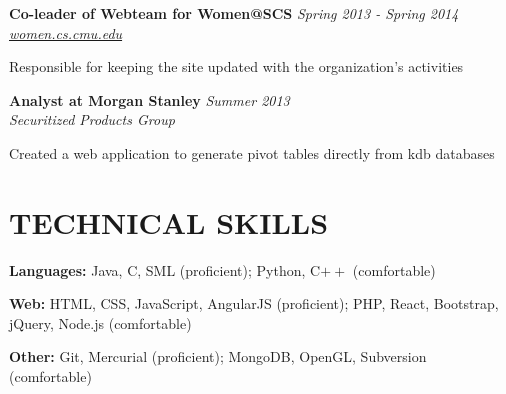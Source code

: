 \documentclass[margin, 11pt]{res} %
\begin{document}
\begin{resume}
\vspace{3pt}

{\bf Co-leader of Webteam for Women@SCS} \hfill {\sl Spring 2013 - Spring 2014}\\
\href{{women.cs.cmu.edu}}{\sl women.cs.cmu.edu}

\begin{itemize} \itemsep -2pt
{\small
\item Responsible for keeping the site updated with the organization's activities
}
\end{itemize}

\vspace{3pt}

{\bf Analyst at Morgan Stanley} \hfill {\sl Summer 2013} \\
{\sl Securitized Products Group}
\begin{itemize} \itemsep -2pt %
{\small
\item Created a web application to generate pivot tables directly from kdb databases
}
\end{itemize}


\section{TECHNICAL SKILLS}

{\bf Languages:}
Java, C, SML (proficient); Python, C$++$ (comfortable)

\vspace{5pt}

{\bf Web:}
HTML, CSS, JavaScript, AngularJS (proficient); PHP, React, Bootstrap, jQuery, Node.js (comfortable)

\vspace{5pt}

{\bf Other:}
Git, Mercurial (proficient); MongoDB, OpenGL, Subversion (comfortable)



\end{resume}
\end{document}
